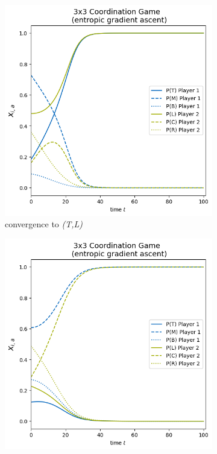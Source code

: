 \begin{figure}[H]
\captionsetup{justification=centering}
\centering
\begin{subfigure}{.5\textwidth}
    \centering
    \includegraphics[width=\textwidth]{logos/Coordination3x3-1.png}
    \caption{convergence to \textit{(T,L)}}
    \label{fig:Coordination3x3a}
\end{subfigure}%
\begin{subfigure}{.5\textwidth}
    \centering
    \includegraphics[width=\textwidth]{logos/Coordination3x3-2.png}

\end{subfigure}
\end{figure}

